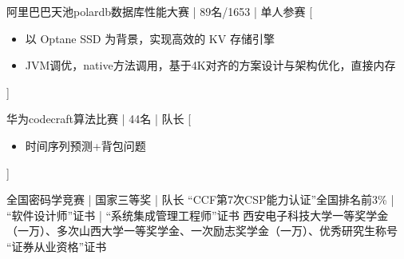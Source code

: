 \documentclass[zh]{resume}
\begin{document}
\begin{entries}
    {阿里巴巴天池polardb数据库性能大赛 | 89名/1653 | 单人参赛}%
    [\begin{itemize}
      \item{\icon{\faFlag}} 以 Optane SSD 为背景，实现高效的 KV 存储引擎
      \item{\icon{\faFlag}} JVM调优，native方法调用，基于4K对齐的方案设计与架构优化，直接内存
    \end{itemize}]%

    {华为codecraft算法比赛 | 44名 | 队长}%
    [\begin{itemize}
      \item{\icon{\faFlag}} 时间序列预测+背包问题\quad {}
    \end{itemize}]%

    {全国密码学竞赛 | 国家三等奖 | 队长 \quad {}}%
    {“CCF第7次CSP能力认证”全国排名前3\% | “软件设计师”证书 | “系统集成管理工程师”证书}
    {西安电子科技大学一等奖学金（一万）、多次山西大学一等奖学金、一次励志奖学金（一万）、优秀研究生称号}
    {“证券从业资格”证书}
\end{entries}
\end{document}
